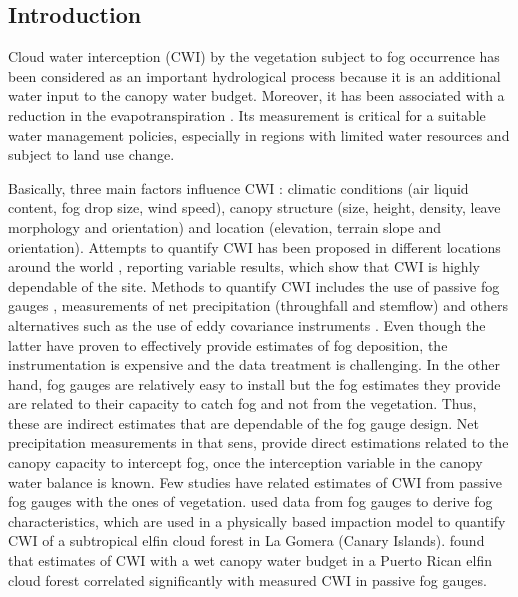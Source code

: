 \documentclass[a4paper,12pt]{article}
\begin{document}
\begin{linenumbers}
\section{Introduction}
Cloud water interception (CWI) by the vegetation subject to fog occurrence has been considered as an important hydrological process because it is an additional water input to the canopy water budget. Moreover, it has been associated with a reduction in the evapotranspiration \citep{Hamiltonetal1995, Bruijnzeel2001, Ritteretal2008}. Its measurement is critical for a suitable water management policies, especially in regions with limited water resources and subject to land use change. 

Basically, three main factors influence CWI \citep{Braumanetal2010, Villegasetal2008, Ritteretal2008}: climatic conditions (air liquid content, fog drop size, wind speed), canopy structure (size, height, density, leave morphology and orientation) and location (elevation, terrain slope and orientation). Attempts to quantify CWI has been proposed in different locations around the world \citep{Ingrahametal1988, CavalierandGoldstein1989, Hamiltonetal1995, Holder2004, McJannetetal2007a, Gabrieletal2008, GomezPeraltaetal2008, Ritteretal2008, Villegasetal2008, Holwerdaetal2010, Ueharaetal2012, Pryetetal2012a}, reporting variable results, which show that CWI is highly dependable of the site. Methods to quantify CWI includes the use of passive fog gauges \citep{Juvik1978, Ingrahametal1988, Aboaletal2000, Villegasetal2008, Frumauetal2011}, measurements of net precipitation (throughfall and stemflow) \citep{Holder2003, Gabrieletal2008, Pradaetal2009, Pryetetal2012a} and others alternatives such as the use of eddy covariance instruments \citep{Changetal2002, Holwerdaetal2006, Eugsteretal2006}. Even though the latter have proven to effectively provide estimates of fog deposition, the instrumentation is expensive and the data treatment is challenging. In the other hand, fog gauges are relatively easy to install but the fog estimates they provide are related to their capacity to catch fog and not from the vegetation. Thus, these are indirect estimates that are dependable of the fog gauge design. Net precipitation measurements in that sens, provide direct estimations related to the canopy capacity to intercept fog, once the interception variable in the canopy water balance is known. Few studies have related estimates of CWI from passive fog gauges with the ones of vegetation. \cite{Ritteretal2008} used data from fog gauges to derive fog characteristics, which are used in a physically based impaction model to quantify CWI of a subtropical elfin cloud forest in La Gomera (Canary Islands). \cite{Holwerdaetal2011} found that estimates of CWI with a wet canopy water budget in a Puerto Rican elfin cloud forest correlated significantly with measured CWI in passive fog gauges.


\end{linenumbers}
\end{document}
